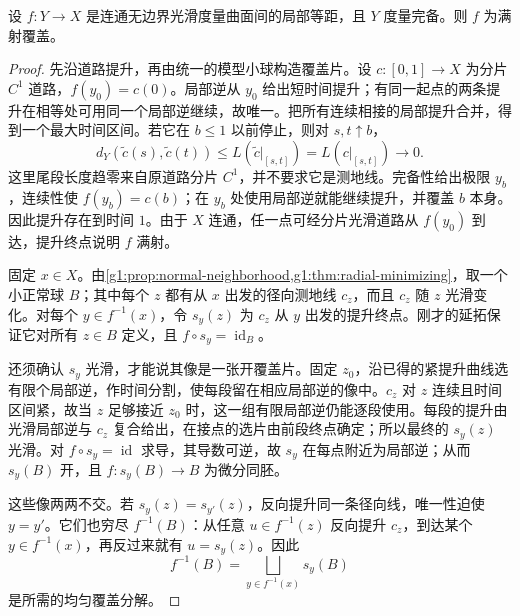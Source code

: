 \begin{lemma}
	\label{g1:lem:complete-local-isometry}
	设 \(f:Y\to X\) 是连通无边界光滑度量曲面间的局部等距，且 \(Y\) 度量完备。则 \(f\) 为满射覆盖。
\end{lemma}
\begin{proof}
	先沿道路提升，再由统一的模型小球构造覆盖片。设 \(c:[0,1]\to X\) 为分片 \(C^1\) 道路，\(f(y_0)=c(0)\)。局部逆从 \(y_0\) 给出短时间提升；有同一起点的两条提升在相等处可用同一个局部逆继续，故唯一。把所有连续相接的局部提升合并，得到一个最大时间区间。若它在 \(b\le1\) 以前停止，则对 \(s,t\uparrow b\)，
	\[
		d_Y(\widetilde c(s),\widetilde c(t))
		\le L(\widetilde c|_{[s,t]})=L(c|_{[s,t]})\longrightarrow0.
	\]
	这里尾段长度趋零来自原道路分片 \(C^1\)，并不要求它是测地线。完备性给出极限 \(y_b\)，连续性使 \(f(y_b)=c(b)\)；在 \(y_b\) 处使用局部逆就能继续提升，并覆盖 \(b\) 本身。因此提升存在到时间 \(1\)。由于 \(X\) 连通，任一点可经分片光滑道路从 \(f(y_0)\) 到达，提升终点说明 \(f\) 满射。

	固定 \(x\in X\)。由\cref{g1:prop:normal-neighborhood,g1:thm:radial-minimizing}，取一个小正常球 \(B\)；其中每个 \(z\) 都有从 \(x\) 出发的径向测地线 \(c_z\)，而且 \(c_z\) 随 \(z\) 光滑变化。对每个 \(y\in f^{-1}(x)\)，令 \(s_y(z)\) 为 \(c_z\) 从 \(y\) 出发的提升终点。刚才的延拓保证它对所有 \(z\in B\) 定义，且 \(f\circ s_y=\operatorname{id}_B\)。

	还须确认 \(s_y\) 光滑，才能说其像是一张开覆盖片。固定 \(z_0\)，沿已得的紧提升曲线选有限个局部逆，作时间分割，使每段留在相应局部逆的像中。\(c_z\) 对 \(z\) 连续且时间区间紧，故当 \(z\) 足够接近 \(z_0\) 时，这一组有限局部逆仍能逐段使用。每段的提升由光滑局部逆与 \(c_z\) 复合给出，在接点的选片由前段终点确定；所以最终的 \(s_y(z)\) 光滑。对 \(f\circ s_y=\operatorname{id}\) 求导，其导数可逆，故 \(s_y\) 在每点附近为局部逆；从而 \(s_y(B)\) 开，且 \(f:s_y(B)\to B\) 为微分同胚。

	这些像两两不交。若 \(s_y(z)=s_{y'}(z)\)，反向提升同一条径向线，唯一性迫使 \(y=y'\)。它们也穷尽 \(f^{-1}(B)\)：从任意 \(u\in f^{-1}(z)\) 反向提升 \(c_z\)，到达某个 \(y\in f^{-1}(x)\)，再反过来就有 \(u=s_y(z)\)。因此
	\[
		f^{-1}(B)=\bigsqcup_{y\in f^{-1}(x)}s_y(B)
	\]
	是所需的均匀覆盖分解。
\end{proof}

